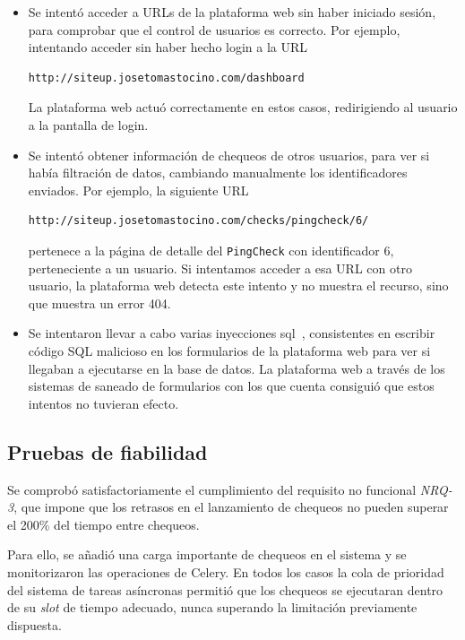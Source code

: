 \begin{itemize}
\item Se intentó acceder a URLs de la plataforma web sin haber iniciado sesión,
  para comprobar que el control de usuarios es correcto. Por ejemplo, intentando
  acceder sin haber hecho login a la URL

\begin{verbatim}
http://siteup.josetomastocino.com/dashboard
\end{verbatim}

  La plataforma web actuó correctamente en estos casos, redirigiendo al usuario
  a la pantalla de login.

\item Se intentó obtener información de chequeos de otros usuarios, para ver si
  había filtración de datos, cambiando manualmente los identificadores
  enviados. Por ejemplo, la siguiente URL

\begin{verbatim}
http://siteup.josetomastocino.com/checks/pingcheck/6/
\end{verbatim}

  pertenece a la página de detalle del \texttt{PingCheck} con identificador 6,
  perteneciente a un usuario. Si intentamos acceder a esa URL con otro usuario,
  la plataforma web detecta este intento y no muestra el recurso, sino que
  muestra un error 404.

\item Se intentaron llevar a cabo varias inyecciones sql~\cite{inyeccion_sql},
  consistentes en escribir código SQL malicioso en los formularios de la
  plataforma web para ver si llegaban a ejecutarse en la base de datos. La
  plataforma web a través de los sistemas de saneado de formularios con los que
  cuenta consiguió que estos intentos no tuvieran efecto.
\end{itemize}

\subsection{Pruebas de fiabilidad}

Se comprobó satisfactoriamente el cumplimiento del requisito no funcional
\textit{NRQ-3}, que impone que los retrasos en el lanzamiento de chequeos no
pueden superar el 200\% del tiempo entre chequeos.

Para ello, se añadió una carga importante de chequeos en el sistema y se
monitorizaron las operaciones de Celery. En todos los casos la cola de prioridad
del sistema de tareas asíncronas permitió que los chequeos se ejecutaran dentro
de su \textit{slot} de tiempo adecuado, nunca superando la limitación
previamente dispuesta.

